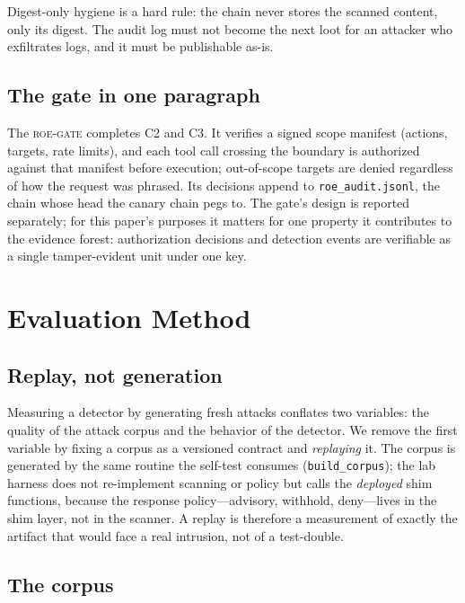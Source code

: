 \documentclass[11pt,a4paper]{article}
\newcommand{\gate}{\textsc{roe-gate}}
\newcommand{\code}[1]{\texttt{#1}}
\begin{document}
Digest-only hygiene is a hard rule: the chain never stores the scanned
content, only its digest. The audit log must not become the next loot for
an attacker who exfiltrates logs, and it must be publishable as-is.

\subsection{The gate in one paragraph}

The \gate{} completes C2 and C3. It verifies a signed scope manifest
(actions, targets, rate limits), and each tool call crossing the boundary is
authorized against that manifest before execution; out-of-scope targets are
denied regardless of how the request was phrased. Its decisions append to
\code{roe\_audit.jsonl}, the chain whose head the canary chain pegs to. The
gate's design is reported separately; for this paper's purposes it matters
for one property it contributes to the evidence forest: authorization
decisions and detection events are verifiable as a single tamper-evident
unit under one key.

\section{Evaluation Method}\label{sec:method}

\subsection{Replay, not generation}

Measuring a detector by generating fresh attacks conflates two variables:
the quality of the attack corpus and the behavior of the detector. We
remove the first variable by fixing a corpus as a versioned contract and
\emph{replaying} it. The corpus is generated by the same routine the
self-test consumes (\code{build\_corpus}); the lab harness does not
re-implement scanning or policy but calls the \emph{deployed} shim
functions, because the response policy---advisory, withhold, deny---lives
in the shim layer, not in the scanner. A replay is therefore a measurement
of exactly the artifact that would face a real intrusion, not of a
test-double.

\subsection{The corpus}
\end{document}
